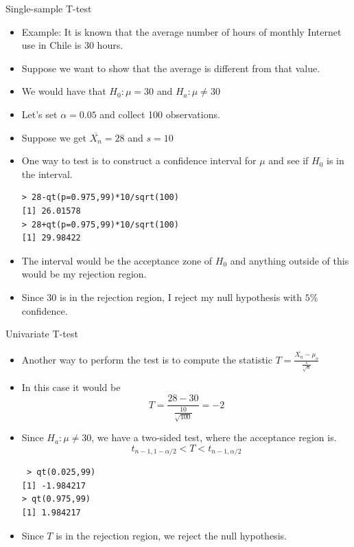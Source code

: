 \documentclass[handout]{beamer}
\begin{document}
\begin{frame}[fragile]{Single-sample T-test}
\scriptsize{
\begin{itemize}
 \item Example: It is known that the average number of hours of monthly Internet use in Chile is 30 hours.
 \item Suppose we want to show that the average is different from that value.
 \item We would have that $H_0: \mu=30$ and $H_{a}: \mu \neq 30$
 \item Let's set $\alpha=0.05$ and collect 100 observations.
 \item Suppose we get $\overline{X_{n}}=28$ and $s=10$
 \item  One way to test is to construct a confidence interval for $\mu$ and see if $H_{0}$ is in the interval.
\begin{verbatim}
> 28-qt(p=0.975,99)*10/sqrt(100)
[1] 26.01578
> 28+qt(p=0.975,99)*10/sqrt(100)
[1] 29.98422 
\end{verbatim}
\item The interval would be the acceptance zone of $H_0$ and anything outside of this would be my rejection region.
\item Since 30 is in the rejection region, I reject my null hypothesis with $5\%$ confidence.
\end{itemize}



} 
\end{frame}


\begin{frame}[fragile]{Univariate T-test}
\scriptsize{
\begin{itemize}
 \item Another way to perform the test is to compute the statistic  $T=\frac{\overline{X_{n}}-\mu_{o}}{\frac{s}{\sqrt{n}}}$
 \item  In this case it would be \begin{displaymath}
                           T=\frac{28-30}{\frac{10}{\sqrt{100}}}=-2
                          \end{displaymath}
\item Since $H_{a}: \mu \neq 30$, we have a two-sided test, where the acceptance region is.
\begin{displaymath}
 t_{n-1,1-\alpha/2}<T<t_{n-1,\alpha/2}
\end{displaymath}
\begin{verbatim}
 > qt(0.025,99)
[1] -1.984217
> qt(0.975,99)
[1] 1.984217
\end{verbatim}
\item Since $T$ is in the rejection region, we reject the null hypothesis.

\end{itemize}



} 
\end{frame}
\end{document}
